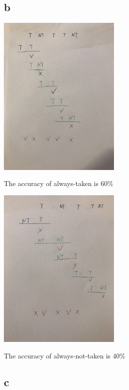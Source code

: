 \documentclass[]{article}
\begin{document}
\subsection*{b}
\begin{center}
	\includegraphics[width=60mm,scale=0.5]{1.jpg}
\end{center}
The accuracy of always-taken is 60\% \newline
\begin{center}
	\includegraphics[width=60mm,scale=0.5]{2.jpg}
\end{center}
The accuracy of always-not-taken is 40\% \newline
\subsection*{c}
\end{document}
